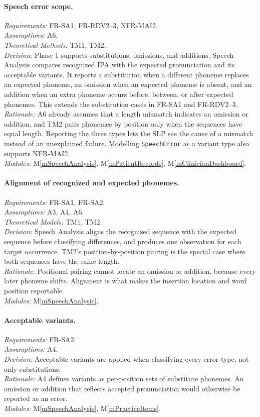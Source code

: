 \documentclass[12pt, titlepage]{article}
\newcommand{\mref}[1]{M\ref{#1}}
\begin{document}
\paragraph{Speech error scope.}
\emph{Requirements:} FR-SA1, FR-RDV2--3, NFR-MAI2.\\
\emph{Assumptions:} A6.\\
\emph{Theoretical Methods:} TM1, TM2.\\
\emph{Decision:} Phase 1 supports substitutions, omissions, and additions.
Speech Analysis compares recognized IPA with the expected pronunciation and its
acceptable variants. It reports a substitution when a different phoneme
replaces an expected phoneme, an omission when an expected phoneme is absent,
and an addition when an extra phoneme occurs before, between, or after expected
phonemes. This extends the substitution cases in FR-SA1 and FR-RDV2--3.\\
\emph{Rationale:} A6 already assumes that a length mismatch indicates an
omission or addition, and TM2 pairs phonemes by position only when the
sequences have equal length. Reporting the three types lets the SLP see the
cause of a mismatch instead of an unexplained failure. Modelling
\texttt{SpeechError} as a variant type also supports NFR-MAI2.\\
\emph{Modules:} \mref{mSpeechAnalysis}, \mref{mPatientRecords}, \mref{mClinicianDashboard}.

\paragraph{Alignment of recognized and expected phonemes.}
\emph{Requirements:} FR-SA1, FR-SA2.\\
\emph{Assumptions:} A3, A4, A6. \\
\emph{Theoretical Models:} TM1, TM2. \\
\emph{Decision:} Speech Analysis aligns the recognized sequence with the
expected sequence before classifying differences, and produces one observation
for each target occurrence. TM2's position-by-position pairing is the special
case where both sequences have the same length.\\
\emph{Rationale:} Positional pairing cannot locate an omission or addition,
because every later phoneme shifts. Alignment is what makes the insertion
location and word position reportable.\\
\emph{Modules:} \mref{mSpeechAnalysis}.

\paragraph{Acceptable variants.}
\emph{Requirements:} FR-SA2.\\
\emph{Assumptions:} A4.\\
\emph{Decision:} Acceptable variants are applied when classifying every error
type, not only substitutions.\\
\emph{Rationale:} A4 defines variants as per-position sets of substitute
phonemes. An omission or addition that reflects accepted pronunciation would
otherwise be reported as an error.\\
\emph{Modules:} \mref{mSpeechAnalysis}, \mref{mPracticeItems}.
\end{document}
